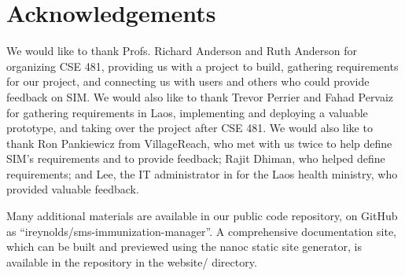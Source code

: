 \documentclass{acm_proc_article-sp}
\begin{document}
\section{Acknowledgements}

We would like to thank Profs. Richard Anderson and Ruth Anderson for organizing CSE 481, providing us with a project to build, gathering requirements for our project, and connecting us with users and others who could provide feedback on SIM. We would also like to thank Trevor Perrier and Fahad Pervaiz for gathering requirements in Laos, implementing and deploying a valuable prototype, and taking over the project after CSE 481. We would also like to thank Ron Pankiewicz from VillageReach, who met with us twice to help define SIM's requirements and to provide feedback; Rajit Dhiman, who helped define requirements; and Lee, the IT administrator in for the Laos health ministry, who provided valuable feedback.


  
\balancecolumns

\appendix
Many additional materials are available in our public code repository, on GitHub as ``ireynolds/sms-immunization-manager''. A comprehensive documentation site, which can be built and previewed using the nanoc static site generator, is available in the repository in the website/ directory.
\end{document}
